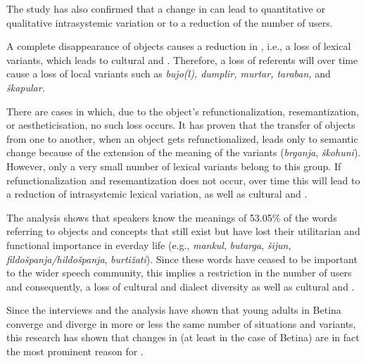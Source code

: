 \documentclass[output=paper]{LSP/langsci}
\begin{document}
The study has also confirmed that a change in  can lead to quantitative or qualitative intrasystemic variation or to a reduction of the number of users. 

A complete disappearance of objects causes a reduction in , i.e., a loss of lexical variants, which leads to cultural and . Therefore, a loss of referents will over time cause a loss of local variants such as \textit{bujo(l), dumplir, murtar, taraban, }and \textit{škapular. }

There are cases in which, due to the object’s refunctionalization, resemantization, or aestheticisation, no such loss occurs. It has proven that the transfer of objects from one  to another, when an object gets refunctionalized, leads only to semantic change because of the extension of the meaning of the variants (\textit{brganja}, \textit{škohuni}). However, only a very small number of lexical variants belong to this group. If refunctionalization and resemantization does not occur, over time this will lead to a reduction of intrasystemic lexical variation, as well as cultural and . 

The analysis shows that speakers know the meanings of 53.05\% of the words referring to objects and concepts that still exist but have lost their utilitarian and functional importance in everday life (e.g., \textit{mankul}, \textit{butarga}, \textit{šijun}, \textit{fildošpanja/hildošpanja}, \textit{burtižati}). Since these words have ceased to be important to the wider speech community, this implies a restriction in the number of users and consequently, a loss of cultural and dialect diversity as well as cultural and .

Since the interviews and the analysis have shown that young adults in Betina converge and diverge in more or less the same number of situations and variants, this research has shown that changes in  (at least in the case of Betina) are in fact the most prominent reason for . 
\end{document}

